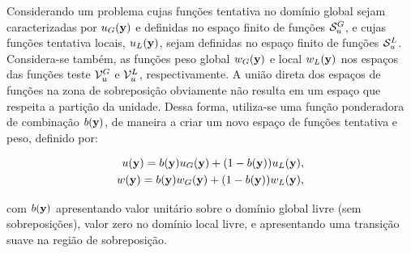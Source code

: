 \begin{figure}[!htbp]
	\label{fig:domains}
\end{figure}

Considerando um problema cujas funções tentativa no domínio global sejam caracterizadas por $u_{G}(\mathbf{y})$ e definidas no espaço finito de funções $\mathcal{S}_u^{G}$, e cujas funções tentativa locais, $u_{L}(\mathbf{y})$, sejam definidas no espaço finito de funções $\mathcal{S}_u^{L}$. Considera-se também, as funções peso global $w_{G}(\mathbf{y})$ e local $w_{L}(\mathbf{y})$ nos espaços das funções teste $\mathcal{V}_u^{G}$ e $\mathcal{V}_u^{L}$, respectivamente. A união direta dos espaços de funções na zona de sobreposição obviamente não resulta em um espaço que respeita a partição da unidade. 
Dessa forma, utiliza-se uma função ponderadora de combinação $b(\mathbf{y})$, de maneira a criar um novo espaço de funções tentativa e peso, definido por:

\begin{align}
u(\mathbf{y}) = b(\mathbf{y})u_{G}(\mathbf{y}) + (1-b(\mathbf{y}))u_{L}(\mathbf{y}),\\
w(\mathbf{y}) = b(\mathbf{y})w_{G}(\mathbf{y}) + (1-b(\mathbf{y}))w_{L}(\mathbf{y}),
\end{align}

\noindent com $b(\mathbf{y})$ apresentando valor unitário sobre o domínio global livre (sem sobreposições), valor zero no domínio local livre, e apresentando uma transição suave na região de sobreposição. 

